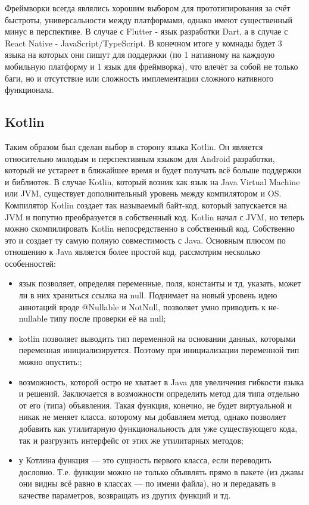 Фреймворки всегда являлись хорошим выбором для прототипирования за счёт быстроты, универсальности между платформами, однако имеют существенный минус в перспективе. В случае с Flutter - язык разработки Dart, а в случае с React Native - JavaScript/TypeScript. В конечном итоге у комнады будет 3 языка на которых они пишут для поддержки (по 1 нативному на каждоую мобильную платформу и 1 язык для фреймворка), что влечёт за собой не только баги, но и отсутствие или сложность имплементации сложного нативного функционала.

\subsection{Kotlin}
Таким образом был сделан выбор в сторону языка Kotlin. Он является относительно молодым и перспективным языком для Android разработки, который не устареет в ближайшее время и будет получать всё больше поддержки и библиотек. В случае Kotlin, который возник как язык на Java Virtual Machine или JVM, существует дополнительный уровень между компилятором и OS. Компилятор Kotlin создает так называемый байт-код, который запускается на JVM и попутно преобразуется в собственный код. Kotlin начал с JVM, но теперь можно скомпилировать Kotlin непосредственно в собственный код. Собственно это и создает ту самую полную совместимость с Java. Основным плюсом по отношению к Java является более простой код, рассмотрим несколько особенностей:

\begin{itemize}
 \item язык позволяет, определяя переменные, поля, константы и тд, указать, может ли в них храниться ссылка на null. Поднимает на новый уровень идею аннотаций вроде @Nullable и NotNull, позволяет умно приводить к не-nullable типу после проверки её на null;
 \item kotlin позволяет выводить тип переменной на основании данных, которыми переменная инициализируется. Поэтому при инициализации переменной тип можно опустить:;
 \item возможность, которой остро не хватает в Java для увеличения гибкости языка и решений. Заключается в возможности определить метод для типа отдельно от его (типа) объявления. Такая функция, конечно, не будет виртуальной и никак не меняет класса, которому мы добавляем метод, однако позволяет добавить как утилитарную функциональность для уже существующего кода, так и разгрузить интерфейс от этих же утилитарных методов;
 \item у Котлина функция — это сущность первого класса, если переводить дословно. Т.е. функции можно не только объявлять прямо в пакете (из джавы они видны всё равно в классах — по имени файла), но и передавать в качестве параметров, возвращать из других функций и тд.
\end{itemize}
 
